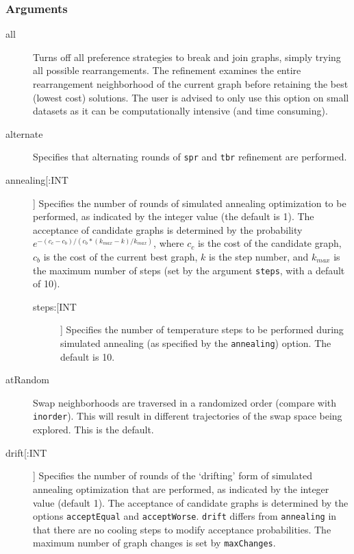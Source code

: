 	\subsubsection{Arguments}
	\begin{description}
	
		\item[all] Turns off all preference strategies to break and join graphs, simply trying all 
		possible rearrangements. The refinement examines the entire rearrangement neighborhood 
		of the current graph before retaining the best (lowest cost) solutions. The user is advised to
		only use this option on small datasets as it can be computationally intensive (and 
		time consuming).

		\item[alternate] Specifies that alternating rounds of \texttt{spr} \citep{Dayhoff1969} 
		and \texttt{tbr} \citep{Farris1988, swofford1990a} refinement are performed.
		
		\item[annealing[:INT]] Specifies the number of rounds of simulated annealing 
		\citep{Metropolisetal1953,Kirkpatricketal1983,Cerny1985} optimization to be performed, 
		as indicated by the integer value (the default is 1). The acceptance of candidate graphs 
		is determined by the probability $e ^ {- (c_c - c_b)/ (c_b * (k_{max} -k)/ k_{max})}$, 
		where $c_c$ is the cost of the candidate graph, $c_b$ is the cost of the current best 
		graph, $k$ is the step number, and $k_{max}$ is the maximum number of steps (set 
		by the argument \texttt{steps}, with a default of 10).
		
		\begin{description}
			
			\item[steps:[INT]] Specifies the number of temperature steps to be performed during 
			simulated annealing (as specified by the \texttt{annealing}) option. The default is 10.
			
		\end{description}
		
		\item[atRandom] Swap neighborhoods are traversed in a randomized order (compare 
		with \texttt{inorder}). 	This will result in different trajectories of the swap space being 
		explored. This is the default.
		
		\item[drift[:INT]] Specifies the number of rounds of the `drifting' form of simulated 
		annealing \citep{goloboff1999} optimization that are performed, as indicated by the integer 
		value (default 1). The acceptance of candidate graphs is determined by the options 
		\texttt{acceptEqual} and \texttt{acceptWorse}. \texttt{drift} differs from \texttt{annealing} 
		in that there are no cooling steps to modify acceptance probabilities. The maximum 
		number of graph changes is set by \texttt{maxChanges}.
			

\end{description}

